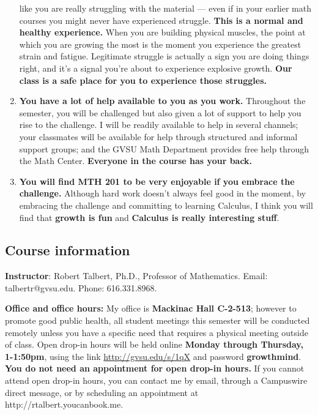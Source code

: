 \documentclass[]{article}
\begin{document}
\begin{enumerate}
  like you are really struggling with the material --- even if in your
  earlier math courses you might never have experienced struggle.
  \textbf{This is a normal and healthy experience.} When you are
  building physical muscles, the point at which you are growing the most
  is the moment you experience the greatest strain and fatigue.
  Legitimate struggle is actually a sign you are doing things right, and
  it's a signal you're about to experience explosive growth. \textbf{Our
  class is a safe place for you to experience those struggles.}
\item
  \textbf{You have a lot of help available to you as you work.}
  Throughout the semester, you will be challenged but also given a lot
  of support to help you rise to the challenge. I will be readily
  available to help in several channels; your classmates will be
  available for help through structured and informal support groups; and
  the GVSU Math Department provides free help through the Math Center.
  \textbf{Everyone in the course has your back.}
\item
  \textbf{You will find MTH 201 to be very enjoyable if you embrace the
  challenge.} Although hard work doesn't always feel good in the moment,
  by embracing the challenge and committing to learning Calculus, I
  think you will find that \textbf{growth is fun} and \textbf{Calculus
  is really interesting stuff}.
\end{enumerate}

\hypertarget{course-information}{%
\subsection{Course information}\label{course-information}}

\textbf{Instructor}: Robert Talbert, Ph.D., Professor of Mathematics.
Email: talbertr@gvsu.edu. Phone: 616.331.8968.

\textbf{Office and office hours:} My office is \textbf{Mackinac Hall
C-2-513}; however to promote good public health, all student meetings
this semester will be conducted remotely unless you have a specific need
that requires a physical meeting outside of class. Open drop-in hours
will be held online \textbf{Monday through Thursday, 1-1:50pm}, using
the link \url{http://gvsu.edu/s/1qX} and password \textbf{growthmind}.
\textbf{You do not need an appointment for open drop-in hours.} If you
cannot attend open drop-in hours, you can contact me by email, through a
Campuswire direct message, or by scheduling an appointment at
http://rtalbert.youcanbook.me.
\end{document}
